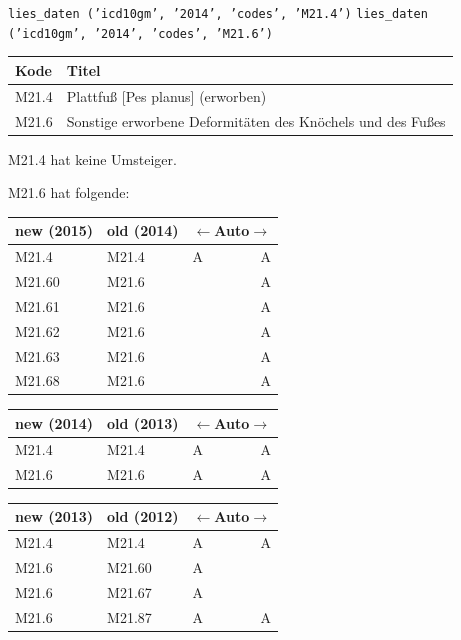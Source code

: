 \texttt{lies\_daten ('icd10gm', '2014', 'codes', 'M21.4')} \newline
\texttt{lies\_daten ('icd10gm', '2014', 'codes', 'M21.6')}

\begingroup
\renewcommand{\arraystretch}{1.2}
\setlength{\tabcolsep}{12pt}
\begin{tabular}{ll}
Kode & Titel \\
\hline
M21.4 & Plattfuß [Pes planus] (erworben) \\
M21.6 & Sonstige erworbene Deformitäten des Knöchels und des Fußes \\
\end{tabular}
\endgroup

M21.4 hat keine Umsteiger.

M21.6 hat folgende:

\begin{minipage}[t]{.5\textwidth}\vspace{0pt}
%
\begingroup
\renewcommand{\arraystretch}{1.2}
\begin{tabular}{p{58pt}p{58pt}lr}
new (2015) & old (2014) & \multicolumn{2}{c}{$\leftarrow$Auto$\rightarrow$} \\
\hline
M21.4 & M21.4 & A & A \\
\hdashline[0.5pt/5pt]
M21.60 & M21.6 & & A \\
M21.61 & M21.6 & & A \\
M21.62 & M21.6 & & A \\
M21.63 & M21.6 & & A \\
M21.68 & M21.6 & & A \\
\end{tabular}
%
\renewcommand{\arraystretch}{1.2}
\begin{tabular}{p{58pt}p{58pt}lr}
new (2014) & old (2013) & \multicolumn{2}{c}{$\leftarrow$Auto$\rightarrow$} \\
\hline
M21.4 & M21.4 & A & A \\
\hdashline[0.5pt/5pt]
M21.6 & M21.6 & A & A \\
\end{tabular}
%
\renewcommand{\arraystretch}{1.2}
\begin{tabular}{p{58pt}p{58pt}lr}
new (2013) & old (2012) & \multicolumn{2}{c}{$\leftarrow$Auto$\rightarrow$} \\
\hline
M21.4 & M21.4 & A & A \\
\hdashline[0.5pt/5pt]
M21.6 & M21.60 & A &  \\
M21.6 & M21.67 & A &  \\
M21.6 & M21.87 & A & A \\
\end{tabular}
\endgroup
%
\end{minipage}
